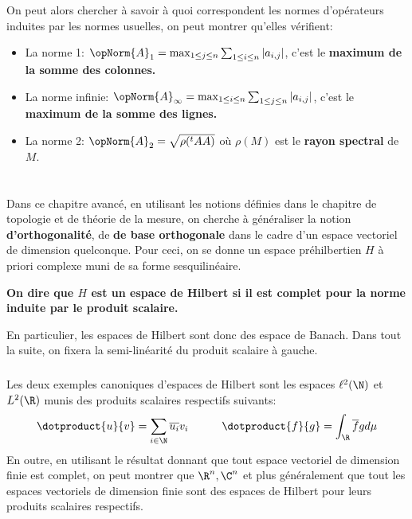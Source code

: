 On peut alors chercher à savoir à quoi correspondent les normes d'opérateurs induites par les normes usuelles, on peut montrer qu'elles vérifient:
\begin{itemize}
   \item La norme 1: \(\opNorm{A}_{1} = \max_{1 \leq j \leq n} \sum_{1 \leq i \leq n} |a_{i,j}|\), c'est le \textbf{maximum de la somme des colonnes.}
   \item La norme infinie: \(\opNorm{A}_{\infty} = \max_{1 \leq i \leq n} \sum_{1 \leq j \leq n} |a_{i,j}|\), c'est le \textbf{maximum de la somme des lignes.}
   \item La norme 2: \(\opNorm{A}_{2} = \sqrt{\rho({}^tAA)}\) où \(\rho(M)\) est le \textbf{rayon spectral} de \(M\).
\end{itemize}

\chapter*{}
Dans ce chapitre avancé, en utilisant les notions définies dans le chapitre de topologie et de théorie de la mesure, on cherche à généraliser la notion \textbf{d'orthogonalité}, de \textbf{de base orthogonale} dans le cadre d'un espace vectoriel de dimension quelconque. Pour ceci, on se donne un espace préhilbertien \( H \) à priori complexe muni de sa forme sesquilinéaire.
\begin{center}
   \textbf{On dire que \( H \) est un espace de Hilbert si il est complet pour la norme induite par le produit scalaire.}
\end{center}
En particulier, les espaces de Hilbert sont donc des espace de Banach. Dans tout la suite, on fixera la semi-linéarité du produit scalaire à gauche.
\subsection*{}
Les deux exemples canoniques d'espaces de Hilbert sont  les espaces \( \ell^2(\N) \) et \( L^2(\R) \) munis des produits scalaires respectifs suivants:
\[ 
   \dotproduct{u}{v} = \sum_{i \in \N} \overline{u_i}v_i \quad\quad\quad \dotproduct{f}{g} = \int_\R \overline{f}g d\mu
\]
En outre, en utilisant le résultat donnant que tout espace vectoriel de dimension finie est complet, on peut montrer que \( \R^n, \C^n \) et plus généralement que tout les espaces vectoriels de dimension finie sont des espaces de Hilbert pour leurs produits scalaires respectifs.
